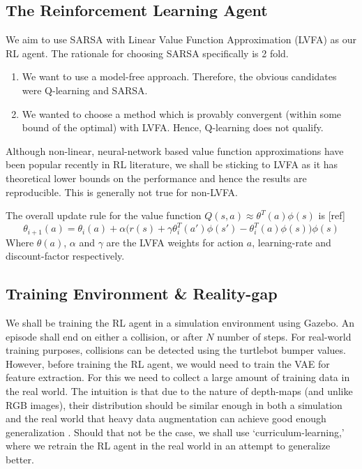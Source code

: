 \documentclass{article}
\begin{document}
\subsection{The Reinforcement Learning Agent}
We aim to use SARSA with Linear Value Function Approximation (LVFA) as our RL agent. The rationale for choosing SARSA specifically is 2 fold.
\begin{enumerate}
    \item We want to use a model-free approach. Therefore, the obvious candidates were Q-learning and SARSA.
    \item We wanted to choose a method which is provably convergent (within some bound of the optimal) with LVFA. Hence, Q-learning does not qualify.
\end{enumerate}

Although non-linear, neural-network based value function approximations have been popular recently in RL literature, we shall be sticking to LVFA as it has theoretical lower bounds on the performance and hence the results are reproducible. This is generally not true for non-LVFA.

The overall update rule for the value function $Q(s, a) \approx \theta^T(a)\phi(s)$ is [ref]
\begin{equation*}
\theta_{i+1}(a) = \theta_i(a) + \alpha\Big( r(s) + \gamma \theta_{i}^{T}(a')\phi(s') - \theta_{i}^{T}(a) \phi(s) \Big) \phi(s)
\end{equation*}
Where $\theta(a)$, $\alpha$ and $\gamma$ are the LVFA weights for action $a$, learning-rate and discount-factor respectively.

\subsection{Training Environment \& Reality-gap}
We shall be training the RL agent in a simulation environment using Gazebo. An episode shall end on either a collision, or after $N$ number of steps. For real-world training purposes, collisions can be detected using the turtlebot bumper values. However, before training the RL agent, we would need to train the VAE for feature extraction. For this we need to collect a large amount of training data in the real world. The intuition is that due to the nature of depth-maps (and unlike RGB images), their distribution should be similar enough in both a simulation and the real world that heavy data augmentation can achieve good enough generalization \cite{Xie2017TowardsMV, Singla2018MemorybasedDR}. Should that not be the case, we shall use `curriculum-learning,' where we retrain the RL agent in the real world in an attempt to generalize better.
\end{document}
